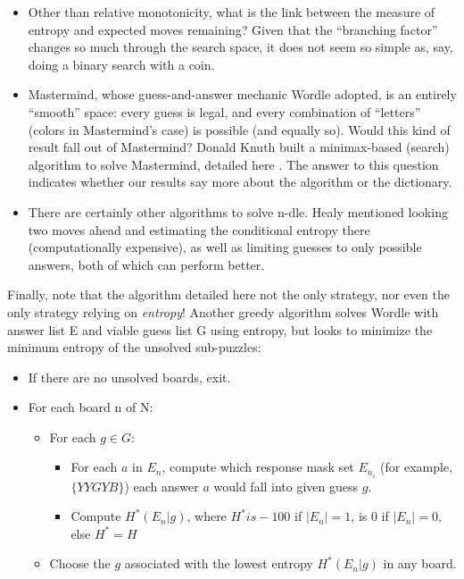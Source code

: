 \documentclass[11pt, oneside]{article} 	%
\begin{document}
\begin{itemize}
\item Other than relative monotonicity, what is the link between the measure of entropy and expected moves remaining? Given that the ``branching factor'' changes so much through the search space, it does not seem so simple as, say, doing a binary search with a coin.
\item Mastermind, whose guess-and-answer mechanic Wordle adopted, is an entirely ``smooth'' space: every guess is legal, and every combination of ``letters'' (colors in Mastermind's case) is possible (and equally so). Would this kind of result fall out of Mastermind? Donald Knuth built a minimax-based (search) algorithm to solve Mastermind, detailed here \cite{5}. The answer to this question indicates whether our results say more about the algorithm or the dictionary.
\item There are certainly other algorithms to solve n-dle. Healy \cite{1} mentioned looking two moves ahead and estimating the conditional entropy there (computationally expensive), as well as limiting guesses to only possible answers, both of which can perform better.
\end{itemize}

Finally, note that the algorithm detailed here not the only strategy, nor even the only strategy relying on \emph{entropy}! Another greedy algorithm solves Wordle with answer list E and viable guess list G using entropy, but looks to minimize the minimum entropy of the unsolved sub-puzzles:
\begin{itemize}
\item If there are no unsolved boards, exit.
\item For each board n of N:
 \begin{itemize}
 \item For each $g \in G$: 
 \begin{itemize}
 \item For each $a$ in $E_n$, compute which response mask set $E_{n_i}$ (for example, $\{YYGYB\}$) each answer $a$ would fall into given guess $g$.
 \item Compute $H^*(E_n | g)$, where $H^* is -100$ if $|E_n| = 1$, is 0 if $|E_n| = 0$, else $H^* = H$ 
 \end{itemize}
 \item Choose the $g$ associated with the lowest entropy $H^*(E_n | g)$ in any board. 
\end{itemize}
\end{itemize}
\end{document}
